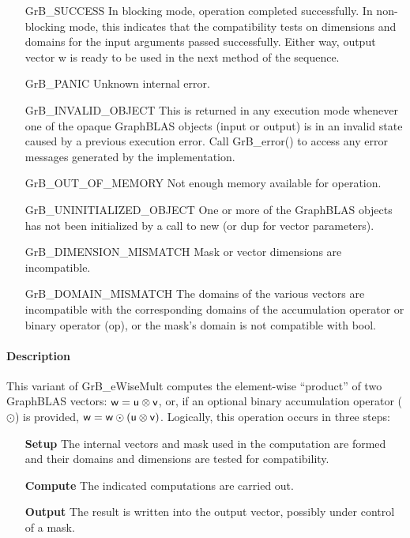 \begin{itemize}[leftmargin=2.1in]
    \item[{\sf GrB\_SUCCESS}]         In blocking mode, operation
	completed successfully. In non-blocking mode, this indicates
	that the compatibility tests on dimensions and domains for the
	input arguments passed successfully. Either way, output vector
	{\sf w} is ready to be used in the next method of the sequence.

    \item[{\sf GrB\_PANIC}]           Unknown internal error.
    
    \item[{\sf GrB\_INVALID\_OBJECT}] This is returned in any execution mode 
    whenever one of the opaque GraphBLAS objects (input or output) is in an invalid 
    state caused by a previous execution error.  Call {\sf GrB\_error()} to access 
    any error messages generated by the implementation.

    \item[{\sf GrB\_OUT\_OF\_MEMORY}] Not enough memory available for operation.
    
    \item[{\sf GrB\_UNINITIALIZED\_OBJECT}] One or more of the GraphBLAS objects 
    has not been initialized by a call to {\sf new} (or {\sf dup} for vector
    parameters).

    \item[{\sf GrB\_DIMENSION\_MISMATCH}] Mask or vector dimensions are incompatible.

	\item[{\sf GrB\_DOMAIN\_MISMATCH}]    The domains of the various
	vectors are incompatible with the corresponding domains of the
	accumulation operator or binary operator ({\sf op}), or the mask's domain 
    is not compatible with {\sf bool}.
\end{itemize}

\paragraph{Description}

This variant of {\sf GrB\_eWiseMult} computes the element-wise ``product'' of
two GraphBLAS vectors: ${\sf w} = {\sf u} \otimes {\sf v}$, or, if an optional
binary accumulation operator ($\odot$) is provided, ${\sf w} = {\sf w} \odot
\left({\sf u} \otimes {\sf v}\right)$.  Logically, this operation occurs in
three steps:
\begin{enumerate}[leftmargin=0.75in]
\item[\bf Setup] The internal vectors and mask used in the computation are formed 
and their domains and dimensions are tested for compatibility.
\item[\bf Compute] The indicated computations are carried out.
\item[\bf Output] The result is written into the output vector, possibly under 
control of a mask.
\end{enumerate}

